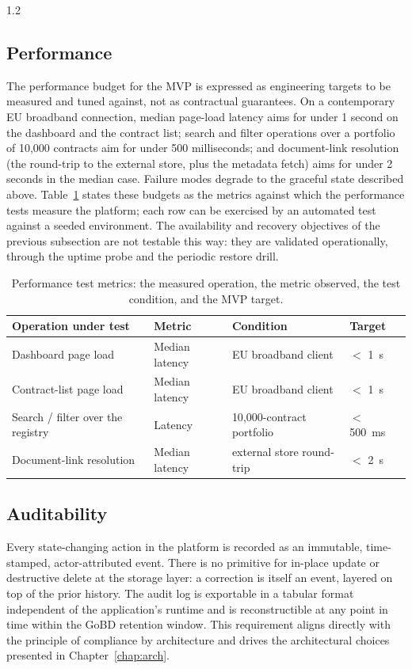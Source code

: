 \begin{spacing}{1.2}
\subsection{Performance}
\label{sec:nfr-perf}
The performance budget for the MVP is expressed as engineering
targets to be measured and tuned against, not as contractual
guarantees. On a contemporary EU broadband connection, median
page-load latency aims for under 1 second on the dashboard and the
contract list; search and filter operations over a portfolio of 10{,}000
contracts aim for under 500 milliseconds; and
document-link resolution (the round-trip to the external store,
plus the metadata fetch) aims for under 2 seconds in the median
case. Failure modes degrade to the graceful state described above.
Table~\ref{tab:perf-metrics} states these budgets as the metrics
against which the performance tests measure the platform; each row can
be exercised by an automated test against a seeded environment. The
availability and recovery objectives of the previous subsection are
not testable this way: they are validated operationally, through the
uptime probe and the periodic restore drill.

\begin{table}[H]
  \centering
  \caption{Performance test metrics: the measured operation, the metric
           observed, the test condition, and the MVP target.}
  \footnotesize
  \begin{tabularx}{\linewidth}{|X|l|l|l|}
    \hline
    \textbf{Operation under test} & \textbf{Metric} & \textbf{Condition}
      & \textbf{Target} \\
    \hline\hline
    Dashboard page load & Median latency & EU broadband client
      & $<$ 1~s \\
    \hline
    Contract-list page load & Median latency & EU broadband client
      & $<$ 1~s \\
    \hline
    Search / filter over the registry & Latency & 10{,}000-contract
      portfolio & $<$ 500~ms \\
    \hline
    Document-link resolution & Median latency & external store
      round-trip & $<$ 2~s \\
    \hline
  \end{tabularx}
  \label{tab:perf-metrics}
\end{table}

\subsection{Auditability}
\label{sec:nfr-audit}
Every state-changing action in the platform is recorded as an immutable,
time-stamped, actor-attributed event. There is no primitive for
in-place update or destructive delete at the storage layer: a correction
is itself an event, layered on top of the prior history. The audit log
is exportable in a tabular format independent of the application's
runtime and is reconstructible at any point in time within the GoBD
retention window. This requirement aligns directly with the principle of
compliance by architecture and drives the architectural choices
presented in Chapter~\ref{chap:arch}.


\end{spacing}
